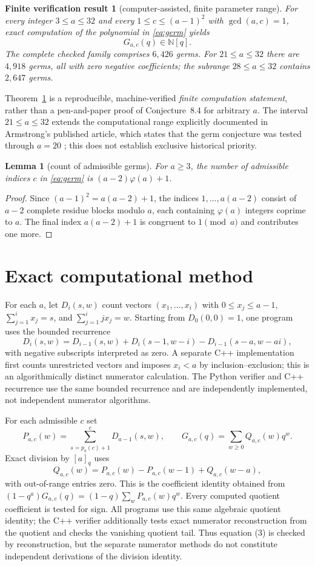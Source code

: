 \documentclass[11pt,a4paper]{article}
\newtheorem{theorem}{Finite verification result}
\newtheorem{lemma}{Lemma}
\newcommand{\NN}{\mathbb{N}}
\begin{document}
\begin{theorem}[computer-assisted, finite parameter range]\label{thm:finite}
For every integer $3\le a\le32$ and every $1\le c\le(a-1)^2$ with $\gcd(a,c)=1$, exact computation of the polynomial in \eqref{eq:germ} yields
\[
G_{a,c}(q)\in\NN[q].
\]
The complete checked family comprises $6{,}426$ germs. For $21\le a\le32$ there are $4{,}918$ germs, all with zero negative coefficients; the subrange $28\le a\le32$ contains $2{,}647$ germs.
\end{theorem}
Theorem~\ref{thm:finite} is a reproducible, machine-verified \emph{finite computation statement}, rather than a pen-and-paper proof of Conjecture~8.4 for arbitrary $a$. The interval $21\le a\le32$ extends the computational range explicitly documented in Armstrong's published article, which states that the germ conjecture was tested through $a=20$ \cite{Armstrong2026}; this does not establish exclusive historical priority.

\begin{lemma}[count of admissible germs]\label{lem:count}
For $a\ge3$, the number of admissible indices $c$ in \eqref{eq:germ} is $(a-2)\varphi(a)+1$.
\end{lemma}
\begin{proof}
Since $(a-1)^2=a(a-2)+1$, the indices $1,\ldots,a(a-2)$ consist of $a-2$ complete residue blocks modulo $a$, each containing $\varphi(a)$ integers coprime to $a$. The final index $a(a-2)+1$ is congruent to $1\pmod a$ and contributes one more.
\end{proof}

\section{Exact computational method}
For each $a$, let $D_i(s,w)$ count vectors $(x_1,\ldots,x_i)$ with $0\le x_j\le a-1$, $\sum_{j=1}^i x_j=s$, and $\sum_{j=1}^i jx_j=w$. Starting from $D_0(0,0)=1$, one program uses the bounded recurrence
\[
D_i(s,w)=D_{i-1}(s,w)+D_i(s-1,w-i)-D_{i-1}(s-a,w-ai),\tag{2}
\]
with negative subscripts interpreted as zero. A separate C++ implementation first counts unrestricted vectors and imposes $x_i<a$ by inclusion--exclusion; this is an algorithmically distinct numerator calculation. The Python verifier and C++ recurrence use the same bounded recurrence and are independently implemented, not independent numerator algorithms.

For each admissible $c$ set\[
P_{a,c}(w)=\sum_{s=p_a(c)+1}^{c}D_{a-1}(s,w),\qquad
G_{a,c}(q)=\sum_{w\ge0}Q_{a,c}(w)q^w.
\]
Exact division by $[a]_q$ uses
\[
Q_{a,c}(w)=P_{a,c}(w)-P_{a,c}(w-1)+Q_{a,c}(w-a),\tag{3}
\]
with out-of-range entries zero. This is the coefficient identity obtained from $(1-q^a)G_{a,c}(q)=(1-q)\sum_wP_{a,c}(w)q^w$. Every computed quotient coefficient is tested for sign. All programs use this same algebraic quotient identity; the C++ verifier additionally tests exact numerator reconstruction from the quotient and checks the vanishing quotient tail. Thus equation (3) is checked by reconstruction, but the separate numerator methods do not constitute independent derivations of the division identity.
\end{document}
